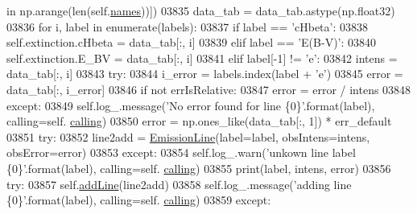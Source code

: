 \begin{DoxyCode}
       \textcolor{keywordflow}{in} np.arange(len(self.\hyperlink{classpyneb_1_1core_1_1pynebcore_1_1_observation_a3f365d0b1488b2eba300bf71caf23c17}{names}))])
03835             data\_tab = data\_tab.astype(np.float32)
03836             \textcolor{keywordflow}{for} i, label \textcolor{keywordflow}{in} enumerate(labels):
03837                 \textcolor{keywordflow}{if} label == \textcolor{stringliteral}{'cHbeta'}:
03838                     self.extinction.cHbeta = data\_tab[:, i]
03839                 \textcolor{keywordflow}{elif} label == \textcolor{stringliteral}{'E(B-V)'}:
03840                     self.extinction.E\_BV = data\_tab[:, i]
03841                 \textcolor{keywordflow}{elif} label[-1] != \textcolor{stringliteral}{'e'}:
03842                     intens = data\_tab[:, i]
03843                     \textcolor{keywordflow}{try}:
03844                         i\_error = labels.index(label + \textcolor{stringliteral}{'e'})
03845                         error = data\_tab[:, i\_error]
03846                         \textcolor{keywordflow}{if} \textcolor{keywordflow}{not} errIsRelative:
03847                             error = error / intens
03848                     \textcolor{keywordflow}{except}:
03849                         self.log\_.message(\textcolor{stringliteral}{'No error found for line \{0\}'}.format(label), calling=self.
      \hyperlink{classpyneb_1_1core_1_1pynebcore_1_1_observation_a2639fad9af4fefad20e4097295bd40e7}{calling})
03850                         error = np.ones\_like(data\_tab[:, 1]) * err\_default
03851                     \textcolor{keywordflow}{try}:
03852                         line2add = \hyperlink{classpyneb_1_1core_1_1pynebcore_1_1_emission_line}{EmissionLine}(label=label, obsIntens=intens, obsError=error)
03853                     \textcolor{keywordflow}{except}:
03854                         self.log\_.warn(\textcolor{stringliteral}{'unkown line label \{0\}'}.format(label), calling=self.
      \hyperlink{classpyneb_1_1core_1_1pynebcore_1_1_observation_a2639fad9af4fefad20e4097295bd40e7}{calling})
03855                         print(label, intens, error)
03856                     \textcolor{keywordflow}{try}:
03857                         self.\hyperlink{classpyneb_1_1core_1_1pynebcore_1_1_observation_a17ddf1c03fd1859cafe36d0593ec5f01}{addLine}(line2add)
03858                         self.log\_.message(\textcolor{stringliteral}{'adding line \{0\}'}.format(label), calling=self.
      \hyperlink{classpyneb_1_1core_1_1pynebcore_1_1_observation_a2639fad9af4fefad20e4097295bd40e7}{calling})
03859                     \textcolor{keywordflow}{except}:

\end{DoxyCode}
